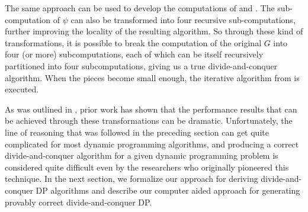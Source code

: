 The same approach can be used to develop the computations of  and .
The sub-computation of $\psi$ can also be transformed into four recursive sub-computations, further improving the locality of the resulting algorithm.
So through these kind of transformations, it is possible to break the computation of the original $G$ into four (or more) subcomputations, each of which can be itself recursively partitioned into four subcomputations, giving us a true divide-and-conquer algorithm.
When the pieces become small enough, the iterative algorithm from  is executed.

As was outlined in , prior work has shown that the performance results that can be achieved through these transformations can be dramatic. Unfortunately, the line of reasoning that was followed in the preceding section can get quite complicated for most dynamic programming algorithms, and producing a correct divide-and-conquer algorithm for a given dynamic programming problem is considered quite difficult even by the researchers who originally pioneered this technique. In the next section, we formalize our approach for deriving divide-and-conquer DP algorithms and describe our computer aided approach for generating provably correct divide-and-conquer DP.


